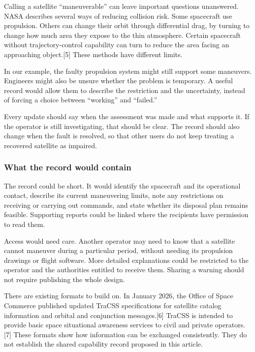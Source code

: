 \documentclass[11pt,letterpaper]{article}
\begin{document}
Calling a satellite ``maneuverable'' can leave important questions
unanswered. NASA describes several ways of reducing collision risk. Some
spacecraft use propulsion. Others can change their orbit through
differential drag, by turning to change how much area they expose to the
thin atmosphere. Certain spacecraft without trajectory-control
capability can turn to reduce the area facing an approaching
object.{[}5{]} These methods have different limits.

In our example, the faulty propulsion system might still support some
maneuvers. Engineers might also be unsure whether the problem is
temporary. A useful record would allow them to describe the restriction
and the uncertainty, instead of forcing a choice between ``working'' and
``failed.''

Every update should say when the assessment was made and what supports
it. If the operator is still investigating, that should be clear. The
record should also change when the fault is resolved, so that other
users do not keep treating a recovered satellite as impaired.

\hypertarget{what-the-record-would-contain}{%
\subsubsection{What the record would
contain}\label{what-the-record-would-contain}}

The record could be short. It would identify the spacecraft and its
operational contact, describe its current maneuvering limits, note any
restrictions on receiving or carrying out commands, and state whether
its disposal plan remains feasible. Supporting reports could be linked
where the recipients have permission to read them.

Access would need care. Another operator may need to know that a
satellite cannot maneuver during a particular period, without needing
its propulsion drawings or flight software. More detailed explanations
could be restricted to the operator and the authorities entitled to
receive them. Sharing a warning should not require publishing the whole
design.

There are existing formats to build on. In January 2026, the Office of
Space Commerce published updated TraCSS specifications for satellite
catalog information and orbital and conjunction messages.{[}6{]} TraCSS
is intended to provide basic space situational awareness services to
civil and private operators.{[}7{]} These formats show how information
can be exchanged consistently. They do not establish the shared
capability record proposed in this article.
\end{document}
